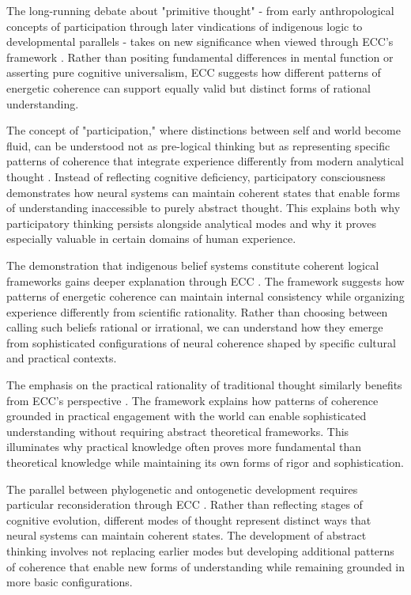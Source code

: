 The long-running debate about "primitive thought" - from early anthropological concepts of participation through later vindications of indigenous logic to developmental parallels - takes on new significance when viewed through ECC's framework \cite{levi1985how}. Rather than positing fundamental differences in mental function or asserting pure cognitive universalism, ECC suggests how different patterns of energetic coherence can support equally valid but distinct forms of rational understanding.

The concept of "participation," where distinctions between self and world become fluid, can be understood not as pre-logical thinking but as representing specific patterns of coherence that integrate experience differently from modern analytical thought \cite{levi1985how}. Instead of reflecting cognitive deficiency, participatory consciousness demonstrates how neural systems can maintain coherent states that enable forms of understanding inaccessible to purely abstract thought. This explains both why participatory thinking persists alongside analytical modes and why it proves especially valuable in certain domains of human experience.

The demonstration that indigenous belief systems constitute coherent logical frameworks gains deeper explanation through ECC \cite{evans1937witchcraft}. The framework suggests how patterns of energetic coherence can maintain internal consistency while organizing experience differently from scientific rationality. Rather than choosing between calling such beliefs rational or irrational, we can understand how they emerge from sophisticated configurations of neural coherence shaped by specific cultural and practical contexts.

The emphasis on the practical rationality of traditional thought similarly benefits from ECC's perspective \cite{godelier1986mental}. The framework explains how patterns of coherence grounded in practical engagement with the world can enable sophisticated understanding without requiring abstract theoretical frameworks. This illuminates why practical knowledge often proves more fundamental than theoretical knowledge while maintaining its own forms of rigor and sophistication.

The parallel between phylogenetic and ontogenetic development requires particular reconsideration through ECC \cite{piaget1971structuralism}. Rather than reflecting stages of cognitive evolution, different modes of thought represent distinct ways that neural systems can maintain coherent states. The development of abstract thinking involves not replacing earlier modes but developing additional patterns of coherence that enable new forms of understanding while remaining grounded in more basic configurations.

